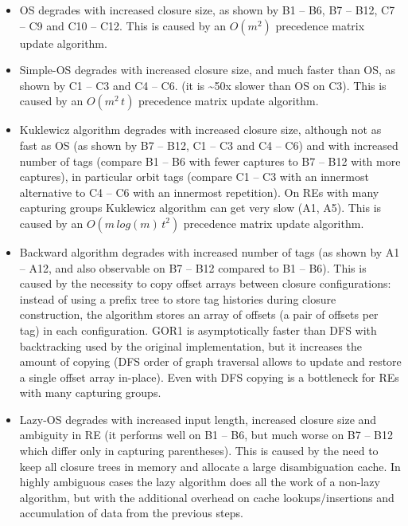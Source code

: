 \documentclass[AMA,STIX1COL]{WileyNJD-v2}
\begin{document}
\begin{itemize}[itemsep=0.2em, topsep=0.5em]
\item OS degrades with increased closure size,
    as shown by B1 -- B6, B7 -- B12, C7 -- C9 and C10 -- C12.
    This is caused by an $O(m^2)$ precedence matrix update algorithm.

\item Simple-OS degrades with increased closure size,
    and much faster than OS,
    as shown by C1 -- C3 and C4 -- C6. (it is \textasciitilde 50x slower than OS on C3).
    This is caused by an $O(m^2 \, t)$ precedence matrix update algorithm.

\item Kuklewicz algorithm degrades with increased closure size, although not as fast as OS (as shown by B7 -- B12, C1 -- C3 and C4 -- C6)
    and with increased number of tags (compare B1 -- B6 with fewer captures to B7 -- B12 with more captures),
    in particular orbit tags (compare C1 -- C3 with an innermost alternative to C4 -- C6 with an innermost repetition).
    On REs with many capturing groups Kuklewicz algorithm can get very slow (A1, A5).
    This is caused by an $O(m \, log(m) \, t^2)$ precedence matrix update algorithm.

\item Backward algorithm degrades with increased number of tags
    (as shown by A1 -- A12, and also observable on B7 -- B12 compared to B1 -- B6).
    This is caused by the necessity to copy offset arrays between closure configurations:
    instead of using a prefix tree to store tag histories during closure construction,
    the algorithm stores an array of offsets (a pair of offsets per tag) in each configuration.
    GOR1 is asymptotically faster than DFS with backtracking used by the original implementation\cite{Cox09},
    but it increases the amount of copying
    (DFS order of graph traversal allows to update and restore a single offset array in-place).
    Even with DFS copying is a bottleneck for REs with many capturing groups.

\item Lazy-OS degrades with increased input length, increased closure size and ambiguity in RE
    (it performs well on B1 -- B6, but much worse on B7 -- B12 which differ only in capturing parentheses).
    This is caused by the need to keep all closure trees in memory and allocate a large disambiguation cache.
    In highly ambiguous cases the lazy algorithm does all the work of a non-lazy algorithm,
    but with the additional overhead on cache lookups/insertions and accumulation of data from the previous steps.


\end{itemize}
\end{document}
